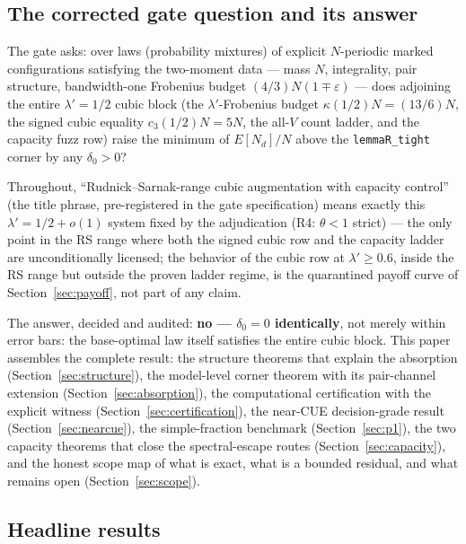 \documentclass[11pt]{article}
\theoremstyle{plain}
\theoremstyle{definition}
\theoremstyle{remark}
\newcommand{\Nd}{N_{d}}
\begin{document}
\subsection{The corrected gate question and its answer}
\label{sec:gatequestion}

The gate asks: over laws (probability mixtures) of explicit $N$-periodic marked
configurations satisfying the two-moment data --- mass $N$, integrality, pair
structure, bandwidth-one Frobenius budget $(4/3) N (1 \mp \varepsilon)$ --- does
adjoining the entire $\lambda' = 1/2$ cubic block (the $\lambda'$-Frobenius
budget $\kappa(1/2) N = (13/6) N$, the signed cubic equality $c_3(1/2) N = 5N$,
the all-$V$ count ladder, and the capacity fuzz row) raise the minimum of
$E[\Nd]/N$ above the \texttt{lemmaR\_tight} corner by any $\delta_0 > 0$?

Throughout, ``Rudnick--Sarnak-range cubic augmentation with capacity control''
(the title phrase, pre-registered in the gate specification) means exactly this
$\lambda' = 1/2 + o(1)$ system fixed by the adjudication (R4: $\theta < 1$
strict) --- the only point in the RS range where both the signed cubic row and
the capacity ladder are unconditionally licensed; the behavior of the cubic row
at $\lambda' \ge 0.6$, inside the RS range but outside the proven ladder regime,
is the quarantined payoff curve of Section~\ref{sec:payoff}, not part of any
claim.

The answer, decided and audited: \textbf{no --- $\delta_0 = 0$ identically}, not
merely within error bars: the base-optimal law itself satisfies the entire cubic
block. This paper assembles the complete result: the structure theorems that
explain the absorption (Section~\ref{sec:structure}), the model-level corner
theorem with its pair-channel extension (Section~\ref{sec:absorption}), the
computational certification with the explicit witness
(Section~\ref{sec:certification}), the near-CUE decision-grade result
(Section~\ref{sec:nearcue}), the simple-fraction benchmark
(Section~\ref{sec:p1}), the two capacity theorems that close the spectral-escape
routes (Section~\ref{sec:capacity}), and the honest scope map of what is exact,
what is a bounded residual, and what remains open (Section~\ref{sec:scope}).

\subsection{Headline results}
\label{sec:headline}
\end{document}
